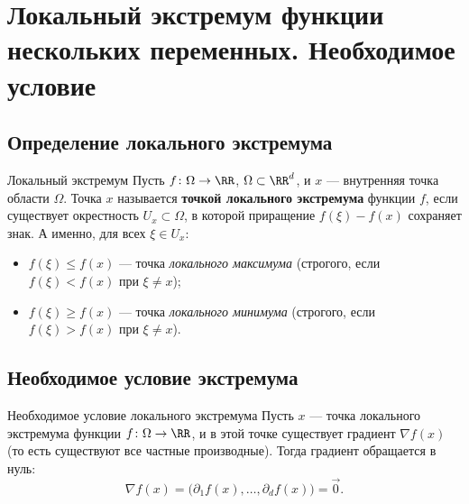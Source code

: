 
\section{Локальный экстремум функции нескольких переменных. Необходимое условие}

\subsection*{Определение локального экстремума}

\begin{Definition}[required]{Локальный экстремум}{}
	Пусть $f\colon\Omega\to\RR$, $\Omega\subset\RR^d$, и $x$ --- внутренняя точка
	области $\Omega$. Точка $x$ называется \textbf{точкой локального экстремума} функции
	$f$, если существует окрестность $U_x\subset\Omega$, в которой приращение
	$f(\xi)-f(x)$ сохраняет знак. А именно, для всех $\xi\in U_x$:
	\begin{itemize}
		\item $f(\xi)\le f(x)$ --- точка \emph{локального максимума}
		(строгого, если $f(\xi)<f(x)$ при $\xi\ne x$);
		\item $f(\xi)\ge f(x)$ --- точка \emph{локального минимума}
		(строгого, если $f(\xi)>f(x)$ при $\xi\ne x$).
	\end{itemize}
\end{Definition}

\subsection*{Необходимое условие экстремума}

\begin{Theorem}{Необходимое условие локального экстремума}{}
	Пусть $x$ --- точка локального экстремума функции $f\colon\Omega\to\RR$, и в этой
	точке существует градиент $\nabla f(x)$ (то есть существуют все частные
	производные). Тогда градиент обращается в нуль:
	\[
	\nabla f(x)=\bigl(\partial_1 f(x),\dots,\partial_d f(x)\bigr)=\vec 0.
	\]
\end{Theorem}


